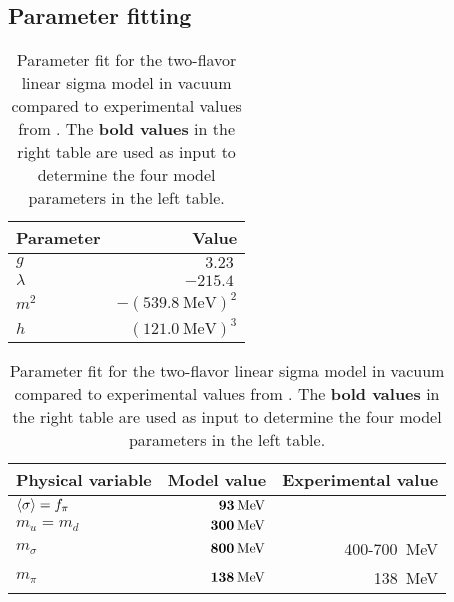 \subsection{Parameter fitting}

\begin{table}
\centering
\begin{tabular}{ l r }
	\toprule
	Parameter   & Value                                 \\
	\midrule
	$g$         & $\SI{3.23}{}$                         \\
	$\lambda$   & $-\SI{215.4}{}$                        \\
	$m^2$       & $-(\SI{539.8}{\mega\electronvolt})^2$ \\
	$h$         & $(\SI{121.0}{\mega\electronvolt})^3$  \\
	\bottomrule
\end{tabular}
\hfill
\begin{tabular}{ l r r }
	\toprule
	Physical variable & Model value                             & Experimental value                      \\
	\midrule
	$\langle \sigma \rangle=f_\pi$ & $\textbf{\SI{93}{\mega\electronvolt}}$  & \TODO{?}                                         \\
	\midrule
	$m_u=m_d$            & $\textbf{\SI{300}{\mega\electronvolt}}$ & \TODO{?}                                         \\
	\midrule
	$m_\sigma$           & $\textbf{\SI{800}{\mega\electronvolt}}$ & \SI{400}{}-\SI{700}{\mega\electronvolt}          \\
	$m_\pi$              & $\textbf{\SI{138}{\mega\electronvolt}}$ & \SI{138}{\mega\electronvolt}                     \\
	\bottomrule
\end{tabular}
\caption{\label{tab:lsm2f:parameters}%
Parameter fit for the two-flavor linear sigma model in vacuum compared to experimental values from \cite{ref:pdg_review_2021}.
The \textbf{bold values} in the right table are used as input to determine the four model parameters in the left table.
}
\end{table}

